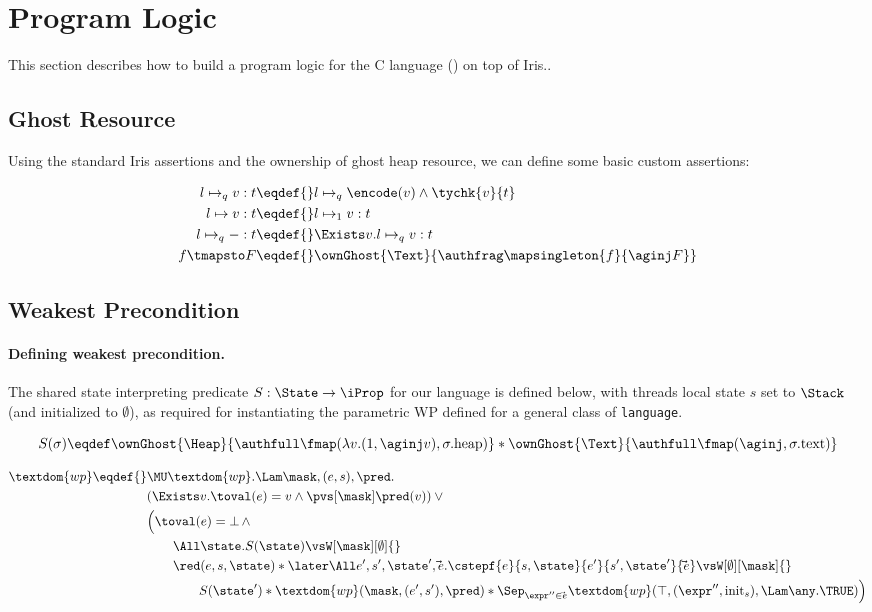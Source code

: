 \section{Program Logic}
\label{sec:program-logic}

This section describes how to build a program logic for the C language (\cf {}) on top of Iris..

\subsection{Ghost Resource}

Using the standard Iris assertions and the ownership of ghost heap resource, we can define some basic custom assertions:

\begin{align*}
l \mapsto_q v : t \eqdef{}&  l \mapsto_q \encode(v) \land \tychk{v}{t} \\
l \mapsto v : t              \eqdef{}& l \mapsto_1 v : t\\
l \mapsto_q - : t            \eqdef{}& \Exists v. l \mapsto_q v : t\\
f \tmapsto F \eqdef{}& \ownGhost{\Text}{\authfrag \mapsingleton{f}{\aginj F}}
\end{align*}

\subsection{Weakest Precondition}

\paragraph{Defining weakest precondition.}

The shared state interpreting predicate $S : \State \to \iProp$ for our \irisc{} language is defined below,
with threads local state $s$ set to $\Stack$ (and initialized to $\emptyset$),
as required for instantiating the parametric WP defined for a general class of \texttt{language}.

\[S(\sigma) \eqdef 
  \ownGhost{\Heap}{\authfull \fmap (\lambda v. (1, \aginj v), \sigma.\text{heap})} *
  \ownGhost{\Text}{\authfull \fmap (\aginj, \sigma.\text{text})}
\]

\begin{align*}
  \textdom{wp} \eqdef{}& \MU \textdom{wp}. \Lam \mask, (e, s), \pred. \\
        & (\Exists v. \toval(e) = v \land \pvs[\mask] \pred(v)) \lor {}\\
        & \Bigl(\toval(e) = \bot \,\land \\
        &\qquad \All \state. S(\state) \vsW[\mask][\emptyset] {}\\
        &\qquad \red(e, s, \state) * \later\All e', s', \state', \vec e.
            \cstepf{e}{s, \state}{e'}{s', \state'}{\vec e} \vsW[\emptyset][\mask] {}\\
            &\qquad\qquad S(\state') * \textdom{wp}(\mask, (e', s'), \pred) *
            \Sep_{\expr'' \in \vec e} \textdom{wp}(\top, (\expr'', \mathrm{init}_s), \Lam \any. \TRUE)\Bigr) \\
\end{align*}

